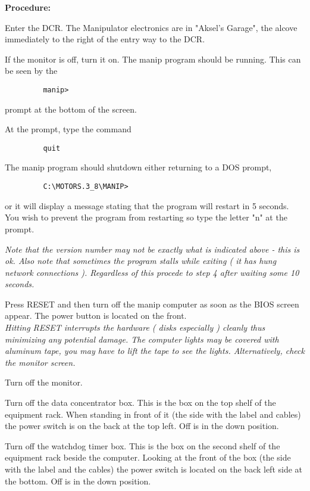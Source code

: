 \noindent
{\bf Procedure:}
  
\begin{enumerate}
\checkitem Enter the DCR.  The Manipulator electronics are in "Aksel's Garage",
     the alcove immediately to the right of the entry way to the DCR.  
  
\checkitem If the monitor is off, turn it on.  
     The manip program should be running.  This can be seen by the
     {\small\begin{verbatim} 
         manip>
     \end{verbatim}}
     prompt at the bottom of the screen.
    
\checkitem At the prompt, type the command
     {\small\begin{verbatim}
         quit
     \end{verbatim}}
     The manip program should shutdown either returning to a DOS prompt,
     {\small\begin{verbatim}
         C:\MOTORS.3_8\MANIP>
     \end{verbatim}}
     or it will display a message stating that the program will restart
     in 5 seconds.  You wish to prevent the program from restarting so
     type the letter "n" at the prompt. 

\small
{\em
Note that the version number may not
be exactly what is indicated above - this is ok. Also note
that sometimes the program stalls while exiting ( it has hung network connections ).
  Regardless of this procede to step 4 after waiting some 10 seconds. }
  \normalsize
  
\checkitem Press RESET and then turn off the manip computer as soon as the BIOS screen appear.  The power button is located on 
    the front.\\
     {\small\em Hitting RESET interrupts the hardware ( disks especially ) cleanly thus minimizing any
potential damage.
         The computer lights may be covered with aluminum tape, you may have to lift
         the tape to see the lights. Alternatively, check the monitor screen.
     }
  
\checkitem Turn off the monitor.
  
\checkitem Turn off the data concentrator box.  This is the box on the top
     shelf of the equipment rack.  When standing in front of it (the
     side with the label and cables) the power switch is on the back at
     the top left.  Off is in the down position.
  
\checkitem Turn off the watchdog timer box.  This is the box on the 
  second shelf of the equipment rack beside the computer.  Looking at the front
  of the box (the side with the label and the cables) the power switch
  is located on the back left side at the bottom.   Off is in the
  down position.
 
\end{enumerate}


